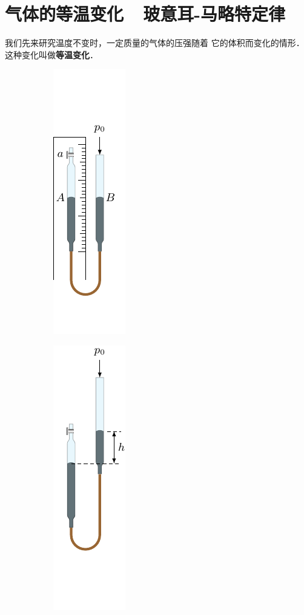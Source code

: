 \section{气体的等温变化~~玻意耳-马略特定律}
我们先来研究温度不变时，一定质量的气体的压强随着
它的体积而变化的情形．这种变化叫做\textbf{等温变化}．
\begin{figure}[htbp]
    \centering
    \begin{subfigure}{0.3\linewidth}
        \centering
        \includegraphics{fig/B/3-5a.pdf}
        \caption{}\label{fig_B_3-5a}
    \end{subfigure}
    \hfil
    \begin{subfigure}{0.3\linewidth}
        \centering
        \includegraphics{fig/B/3-5b.pdf}

\end{subfigure}
\end{figure}
